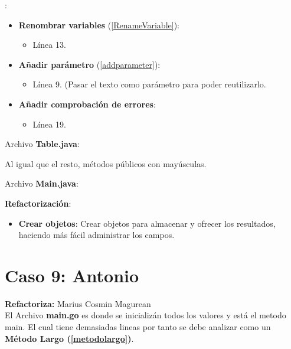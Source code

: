\documentclass[11pt,a4paper,oneside]{book}
\begin{document}


:
\begin{itemize}
    \item \textbf{Renombrar variables} (\ref{RenameVariable}):
    \begin{itemize}
        \item Línea 13.
    \end{itemize}
    
    \item \textbf{Añadir parámetro} (\ref{addparameter}):
    \begin{itemize}
        \item Línea 9. (Pasar el texto como parámetro para poder reutilizarlo.
    \end{itemize}
    
    \item \textbf{Añadir comprobación de errores}:
    \begin{itemize}
        \item Línea 19.
    \end{itemize}
\end{itemize}

Archivo \textbf{Table.java}:


Al igual que el resto, métodos públicos con mayúsculas.

Archivo \textbf{Main.java}:


\textbf{Refactorización}:
\begin{itemize}
    \item \textbf{Crear objetos}: Crear objetos para almacenar y ofrecer los resultados, haciendo más fácil administrar los campos.
\end{itemize}



\chapter {Caso 9: Antonio}
\textbf{Refactoriza:} Marius Cosmin Magurean\\

El Archivo \textbf{main.go} es donde se inicializán todos los valores y está el metodo main.
El cual tiene demasiadas lineas por tanto se debe analizar como un
\textbf{Método Largo (\ref{metodolargo})}.

\end{document}
